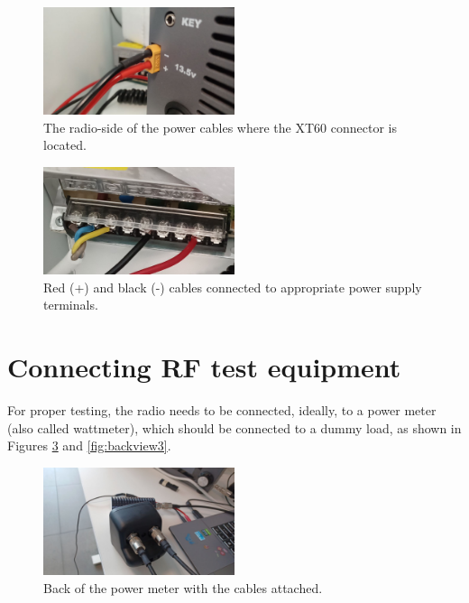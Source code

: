 \documentclass[11pt,a4paper]{article}
\begin{document}
\begin{figure}[!ht]
  \centering
  \includegraphics[width=0.5\textwidth]{pictures/psu1.jpeg}
  \caption{The radio-side of the power cables where the XT60 connector is located.}
  \label{fig:psu1}
\end{figure}

\begin{figure}[!ht]
  \centering
  \includegraphics[width=0.5\textwidth]{pictures/psu2.jpeg}
  \caption{Red (+) and black (-) cables connected to appropriate power supply terminals.}
  \label{fig:psu2}
\end{figure}

\section{Connecting RF test equipment}

For proper testing, the radio needs to be connected, ideally, to a power meter (also called wattmeter), which should be connected to a dummy load, as shown in Figures \ref{fig:backview1} and \ref{fig:backview3}.

\begin{figure}[H]
  \centering
  \includegraphics[width=0.5\textwidth]{pictures/wattmeter_1.jpeg}
  \caption{Back of the power meter with the cables attached.}
  \label{fig:backview1}
\end{figure}
\end{document}
